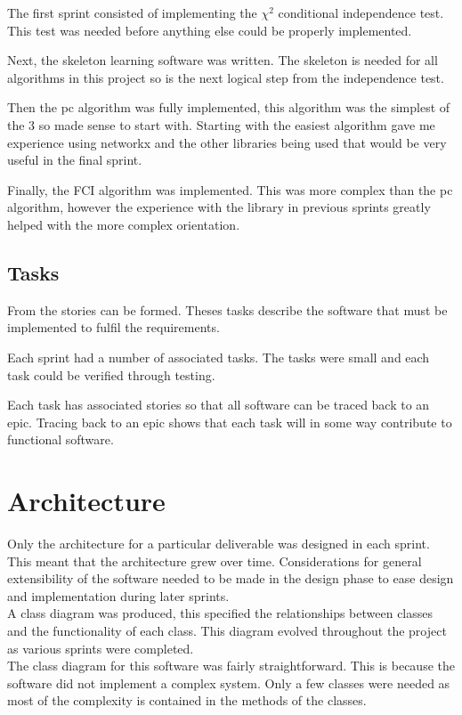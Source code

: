 \documentclass{UoYCSproject}
\begin{document}
The first sprint consisted of implementing the $\chi ^2$ conditional independence test. This test was needed before anything else could be properly implemented.

Next, the skeleton learning software was written. The skeleton is needed for all algorithms in this project so is the next logical step from the independence test.

Then the pc algorithm was fully implemented, this algorithm was the simplest of the 3 so made sense to start with. Starting with the easiest algorithm gave me experience using networkx and the other libraries being used that would be very useful in the final sprint.

Finally, the FCI algorithm was implemented. This was more complex than the pc algorithm, however the experience with the library in previous sprints greatly helped with the more complex orientation.

\subsection{Tasks}
From the stories can be formed. Theses tasks describe the software that must be implemented to fulfil the requirements.

Each sprint had a number of associated tasks. The tasks were small and each task could be verified through testing.

Each task has associated stories so that all software can be traced back to an epic. Tracing back to an epic shows that each task will in some way contribute to functional software.\\
\section{Architecture}
Only the architecture for a particular deliverable was designed in each sprint. This meant that the architecture grew over time. Considerations for general extensibility of the software needed to be made in the design phase to ease design and implementation during later sprints.\\

A class diagram was produced, this specified the relationships between classes and the functionality of each class. This diagram evolved throughout the project as various sprints were completed.\\

The class diagram for this software was fairly straightforward. This is because the software did not implement a complex system. Only a few classes were needed as most of the complexity is contained in the methods of the classes.
\end{document}
